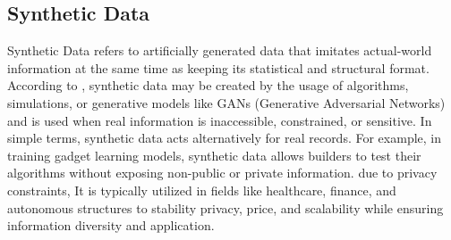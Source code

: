 \documentclass[twoside,11pt]{article}
\begin{document}
\subsection{Synthetic Data}
Synthetic Data refers to artificially generated data that imitates actual-world information at the same time as keeping its statistical and structural format. According to \citealp{SyntheticPatki2016}, synthetic data may be created by the usage of algorithms, simulations, or generative models like GANs (Generative Adversarial Networks) and is used when real information is inaccessible, constrained, or sensitive.
In simple terms, synthetic data acts alternatively for real records. For example, in training gadget learning models, synthetic data allows builders to test their algorithms without exposing non-public or private information. due to privacy constraints, It is typically utilized in fields like healthcare, finance, and autonomous structures to stability privacy, price, and scalability while ensuring information diversity and application.
\end{document}
